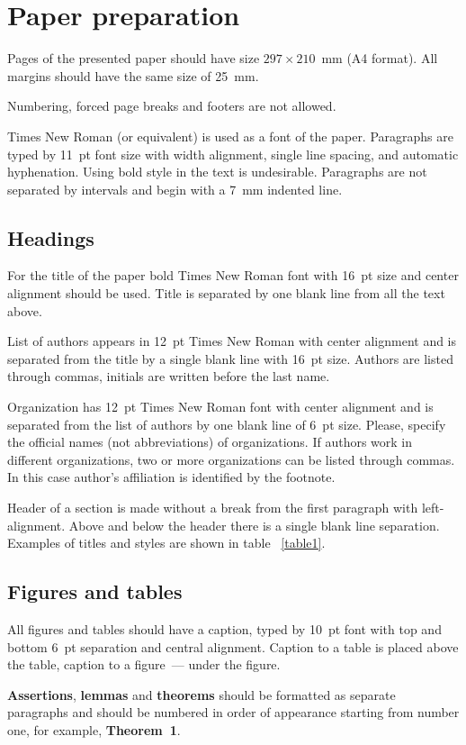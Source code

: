 \documentclass[11pt, oneside, a4paper]{article}
\begin{document}
\section{Paper preparation}
Pages of the presented paper should have size
$297 \times 210$~mm (A4 format). All margins should have the same size of 25~mm.

Numbering, forced page breaks and footers are not allowed.

Times New Roman (or equivalent) is used as a font of the paper. 
Paragraphs are typed by 11~pt font size with width alignment, 
single line spacing, and automatic hyphenation. Using bold style in the text is 
undesirable. Paragraphs are not separated by intervals and begin with a 7~mm indented line.

\subsection{Headings}
For the title of the paper bold Times New Roman font with 16~pt size and center alignment should be used. 
Title is separated by one blank line from all the text above.

List of authors appears in 12~pt Times New Roman with center alignment and is 
separated from the title by a single blank line with 16~pt size. Authors are listed 
through commas, initials are written before the last name. 

Organization has 12~pt Times New Roman font with center alignment and is separated 
from the list of authors by one blank line of 6~pt size. Please, specify the official names (not abbreviations) of organizations. 
If authors work in different organizations, two or more organizations can be listed through commas. 
In this case author's affiliation is identified by the footnote.

Header of a section is made without a break from the first paragraph with left-alignment. 
Above and below the header there is a single blank line separation. 
Examples of titles and styles are shown in table ~\ref{table1}.

\subsection{Figures and tables}
All figures and tables should have a caption, typed by 10~pt font with top and bottom 6~pt 
separation and central alignment. Caption to a table is placed above the table, 
caption to a figure~--- under the figure. 

\textbf{Assertions}, \textbf{lemmas} and \textbf{theorems} should be formatted as separate paragraphs and 
should be numbered in order of appearance starting from number one, for example, \textbf{Theorem~1}.
\end{document}

